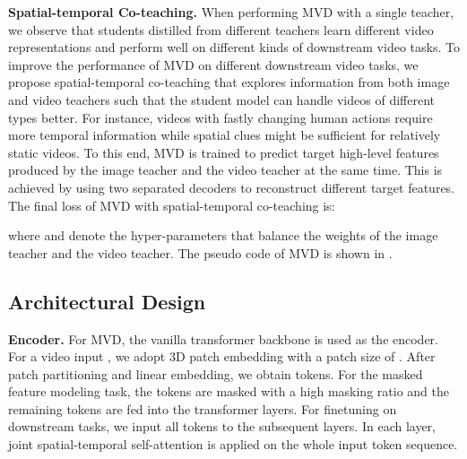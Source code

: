 \documentclass[10pt,twocolumn,letterpaper]{article}
\makeatletter
\newcommand*{\system}{MVD\@\xspace}
\makeatother
\begin{document}
\vspace{0.05in}
\noindent \textbf{Spatial-temporal Co-teaching.} When performing MVD with a single teacher, we observe that students distilled from different teachers learn different video representations and perform well on different kinds of downstream video tasks. To improve the performance of MVD on different downstream video tasks, we propose spatial-temporal co-teaching that explores information from both image and video teachers such that the student model can handle videos of different types better. For instance, videos with fastly changing human actions require more temporal information while spatial clues might be sufficient for relatively static videos. To this end, \system is trained to predict target high-level features produced by the image teacher and the video teacher at the same time.
This is achieved by using two separated decoders to reconstruct different target features. The final loss of MVD with spatial-temporal co-teaching is:



where  and  denote the hyper-parameters that balance the weights of the image teacher and the video teacher. The pseudo code of \system is shown in .


\subsection{Architectural Design}
\label{sec:network}
\noindent \textbf{Encoder.} For MVD, the vanilla transformer backbone is used as the encoder. For a video input , we adopt 3D patch embedding with a patch size of . After patch partitioning and linear embedding, we obtain  tokens. For the masked feature modeling task, the tokens are masked with a high masking ratio and the remaining tokens are fed into the transformer layers. For finetuning on downstream tasks, we input all tokens to the subsequent layers. In each layer, joint spatial-temporal self-attention is applied on the whole input token sequence. 
\end{document}
